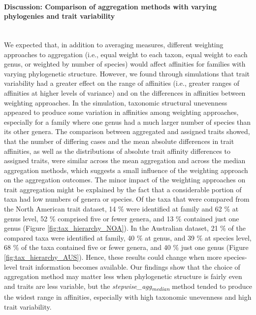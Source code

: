 \documentclass[12pt]{article}
\begin{document}
\paragraph*{Discussion: Comparison of aggregation methods with varying phylogenies and trait variability}
\hfill
\\

We expected that, in addition to averaging measures, different weighting approaches to aggregation (i.e., equal weight to each taxon, equal weight to each genus, or weighted by number of species) would affect affinities for families with varying phylogenetic structure. However, we found through simulations that trait variability had a greater effect on the range of affinities (i.e., greater ranges of affinities at higher levels of variance) and on the differences in affinities between weighting approaches. In the simulation, taxonomic structural unevenness appeared to produce some variation in affinities among weighting approaches, especially for a family where one genus had a much larger number of species than its other genera. The comparison between aggregated and assigned traits showed, that the number of differing cases and the mean absolute differences in trait affinities, as well as the distributions of absolute trait affinity differences to assigned traits, were similar across the mean aggregation and across the median aggregation methods, which suggests a small influence of the weighting approach on the aggregation outcomes. The minor impact of the weighting approaches on trait aggregation might be explained by the fact that a considerable portion of taxa had low numbers of genera or species. Of the taxa that were compared from the North American trait dataset, 14 \% were identified at family and 62 \% at genus level, 52 \% comprised five or fewer genera, and 13 \% contained just one genus (Figure \ref{fig:tax_hierarchy_NOA}). In the Australian dataset, 21 \% of the compared taxa were identified at family, 40 \% at genus, and 39 \% at species level, 68 \% of the taxa contained five or fewer genera, and 40 \% just one genus (Figure \ref{fig:tax_hierarchy_AUS}). Hence, these results could change when more species-level trait information becomes available. Our findings show that the choice of aggregation method may matter less when phylogenetic structure is fairly even and traits are less variable, but the \textit{stepwise\_agg\textsubscript{median}} method tended to produce the widest range in affinities, especially with high taxonomic unevenness and high trait variability. 
\end{document}
